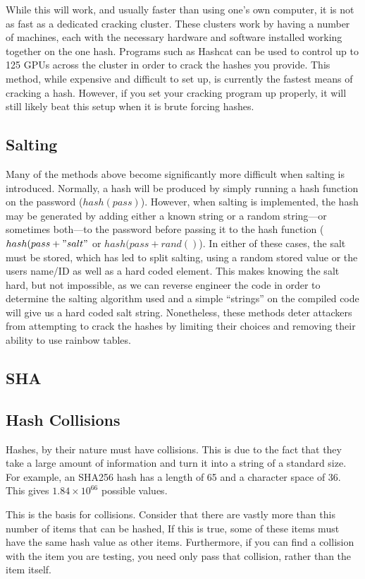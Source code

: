 			While this will work, and usually faster than using one's own computer, it is not as fast as a dedicated cracking cluster. 
			These clusters work by having a number of machines, each with the necessary hardware and software installed working together on the one hash. 
			Programs such as Hashcat can be used to control up to 125 GPUs across the cluster in order to crack the hashes you provide. 
			This method, while expensive and difficult to set up, is currently the fastest means of cracking a hash. 
			However, if you set your cracking program up properly, it will still likely beat this setup when it is brute forcing hashes. 
		\subsection{Salting}
			Many of the methods above become significantly more difficult when salting is introduced. 
			Normally, a hash will be produced by simply running a hash function on the password ($hash(pass)$). 
			However, when salting is implemented, the hash may be generated by adding either a known string or a random string---or sometimes both---to the password before passing it to the hash function ($hash(pass + "salt"$ or $hash(pass + rand()$).
			In either of these cases, the salt must be stored, which has led to split salting, using a random stored value or the users name/ID as well as a hard coded element. 
			This makes knowing the salt hard, but not impossible, as we can reverse engineer the code in order to determine the salting algorithm used and a simple ``strings'' on the compiled code will give us a hard coded salt string. 
			Nonetheless, these methods deter attackers from attempting to crack the hashes by limiting their choices and removing their ability to use rainbow tables. 
		\subsection{SHA}
		\subsection{Hash Collisions}
			Hashes, by their nature must have collisions. 
			This is due to the fact that they take a large amount of information and turn it into a string of a standard size. 
			For example, an SHA256 hash has a length of 65 and a character space of 36. 
			This gives $1.84\times10^{66}$ possible values. 

			This is the basis for collisions. 
			Consider that there are vastly more than this number of items that can be hashed, 
			If this is true, some of these items must have the same hash value as other items.
			Furthermore, if you can find a collision with the item you are testing, you need only pass that collision, rather than the item itself. 

